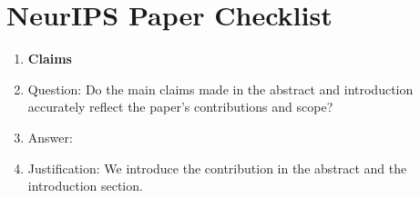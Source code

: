 \newpage
\section*{NeurIPS Paper Checklist}



\begin{enumerate}

\item {\bf Claims}
    \item[] Question: Do the main claims made in the abstract and introduction accurately reflect the paper's contributions and scope?
    \item[] Answer: \answerYes{} %
    \item[] Justification: We introduce the contribution in the abstract and the introduction section. 


\end{enumerate}

